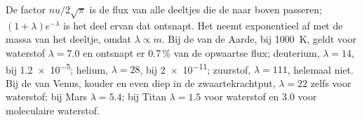 De factor $n u/2\sqrt\pi$ is de flux van alle deeltjes die
de  naar boven passeren; $(1 + \lambda)e^{-\lambda}$ is het deel ervan
dat ontsnapt. Het neemt exponentieel af met de massa van het deeltje, omdat
$\lambda \propto m$. Bij de  van de Aarde, bij \qty{1000}{K}, geldt voor waterstof
$\lambda = 7.0$ en ontsnapt er 0.7\,\% van de opwaartse
flux; deuterium, $\lambda = 14$, bij \num{1.2e-5}; helium, $\lambda = 28$,
bij \num{2e-11}; zuurstof, $\lambda = 111$, helemaal niet. Bij de  van
Venus, kouder en even diep in de zwaartekrachtput, $\lambda = 22$ zelfs voor
waterstof; bij Mars $\lambda = 5.4$; bij Titan $\lambda = 1.5$ voor waterstof
en 3.0 voor moleculaire waterstof.

